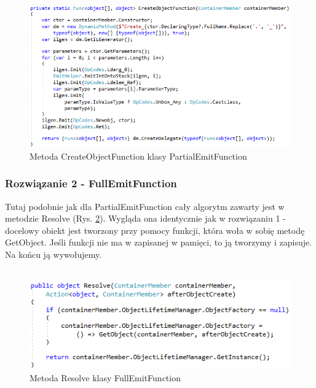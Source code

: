 \documentclass[12pt]{article}
\begin{document}
\begin{figure}[H]
	\begin{center}
  		\includegraphics{PartialEmitFunction_CreateObjectFunction.png}
  		\caption{Metoda CreateObjectFunction klasy PartialEmitFunction}
  		\label{fig:PartialEmitFunction_CreateObjectFunction}
	\end{center}
\end{figure}

\subsubsection{Rozwiązanie 2 - FullEmitFunction}
Tutaj podobnie jak dla PartialEmitFunction cały algorytm zawarty jest w metodzie Resolve (Rys. \ref{fig:FullEmitFunction_Resolve}). Wygląda ona identycznie jak w rozwiązaniu 1 - docelowy obiekt jest tworzony przy pomocy funkcji, która woła w sobię metodę GetObject. Jeśli funkcji nie ma w zapisanej w pamięci, to ją tworzymy i zapisuje. Na końcu ją wywołujemy.\\ \\
\begin{figure}[H]
	\begin{center}
  		\includegraphics{FullEmitFunction_Resolve.png}
  		\caption{Metoda Resolve klasy FullEmitFunction}
  		\label{fig:FullEmitFunction_Resolve}
	\end{center}
\end{figure}
\end{document}
